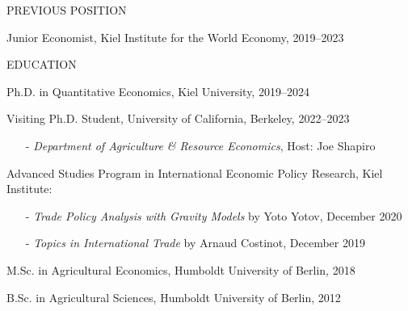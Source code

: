 \documentclass{article}
\begin{document}

\begin{minipage}[t]{0.12\textwidth}
    {\selectfont PREVIOUS POSITION} \\
\end{minipage}
\hspace{5mm}
\begin{minipage}[t]{0.8\textwidth} 
    Junior Economist, Kiel Institute for the World Economy, 2019--2023 \par
\end{minipage}
\medskip


\begin{minipage}[t]{0.12\textwidth}
    {\selectfont EDUCATION} \\
\end{minipage}
\hspace{5mm}
\begin{minipage}[t]{0.8\textwidth}
    Ph.D. in Quantitative Economics, Kiel University, 2019--2024 \par
    Visiting Ph.D. Student, University of California, Berkeley, 2022--2023 \par
        \begin{itemize}
        \item[-] \textit{Department of Agriculture \& Resource Economics}, Host: Joe Shapiro
    \end{itemize}
    Advanced Studies Program in International Economic Policy Research, Kiel Institute:
    \begin{itemize}
        \item[-] \textit{Trade Policy Analysis with Gravity Models} by Yoto Yotov, December 2020 
        \item[-] \textit{Topics in International Trade} by Arnaud Costinot, December 2019
    \end{itemize}
    M.Sc. in Agricultural Economics, Humboldt University of Berlin, 2018 \par
    B.Sc. in Agricultural Sciences, Humboldt University of Berlin, 2012 \par
\end{minipage}
\medskip

\end{document}
